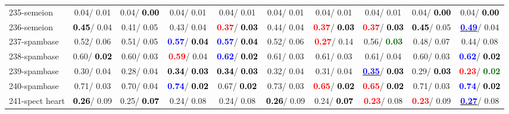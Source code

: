 \begin{table}[h]
\begin{center}
{\begin{tabular}{lc|c|c|c|c|c|c|c|c}
235-semeion &   0.04/  0.01 &   0.04/\textcolor{black}{\textbf{  0.00}} &   0.04/  0.01 &   0.04/  0.01 &   0.04/  0.01 &   0.04/  0.01 &   0.04/  0.01 &   0.04/\textcolor{black}{\textbf{  0.00}} &   0.04/\textcolor{black}{\textbf{  0.00}} \\
236-semeion & \textcolor{black}{\textbf{  0.45}}/  0.04 &   0.41/  0.05 &   0.43/  0.04 & \textcolor{red}{\textbf{  0.37}}/\textcolor{black}{\textbf{  0.03}} &   0.44/  0.04 & \textcolor{red}{\textbf{  0.37}}/\textcolor{black}{\textbf{  0.03}} & \textcolor{red}{\textbf{  0.37}}/\textcolor{black}{\textbf{  0.03}} & \textcolor{black}{\textbf{  0.45}}/  0.05 & \underline{\textcolor{blue}{\textbf{  0.49}}}/  0.04 \\
237-spambase &   0.52/  0.06 &   0.51/  0.05 & \textcolor{blue}{\textbf{  0.57}}/\textcolor{black}{\textbf{  0.04}} & \textcolor{blue}{\textbf{  0.57}}/\textcolor{black}{\textbf{  0.04}} &   0.52/  0.06 & \textcolor{red}{\textbf{  0.27}}/  0.14 &   0.56/\textcolor{darkgreen}{\textbf{  0.03}} &   0.48/  0.07 &   0.44/  0.08 \\
238-spambase &   0.60/\textcolor{black}{\textbf{  0.02}} &   0.60/  0.03 & \textcolor{red}{\textbf{  0.59}}/  0.04 & \textcolor{blue}{\textbf{  0.62}}/\textcolor{black}{\textbf{  0.02}} &   0.61/  0.03 &   0.61/  0.03 &   0.61/  0.04 &   0.60/  0.03 & \textcolor{blue}{\textbf{  0.62}}/\textcolor{black}{\textbf{  0.02}} \\ \hline
239-spambase &   0.30/  0.04 &   0.28/  0.04 & \textcolor{black}{\textbf{  0.34}}/\textcolor{black}{\textbf{  0.03}} & \textcolor{black}{\textbf{  0.34}}/\textcolor{black}{\textbf{  0.03}} &   0.32/  0.04 &   0.31/  0.04 & \underline{\textcolor{blue}{\textbf{  0.35}}}/\textcolor{black}{\textbf{  0.03}} &   0.29/\textcolor{black}{\textbf{  0.03}} & \textcolor{red}{\textbf{  0.23}}/\textcolor{darkgreen}{\textbf{  0.02}} \\
240-spambase &   0.71/  0.03 &   0.70/  0.04 & \textcolor{blue}{\textbf{  0.74}}/\textcolor{black}{\textbf{  0.02}} &   0.67/\textcolor{black}{\textbf{  0.02}} &   0.73/  0.03 & \textcolor{red}{\textbf{  0.65}}/\textcolor{black}{\textbf{  0.02}} & \textcolor{red}{\textbf{  0.65}}/\textcolor{black}{\textbf{  0.02}} &   0.71/  0.03 & \textcolor{blue}{\textbf{  0.74}}/\textcolor{black}{\textbf{  0.02}} \\
241-spect heart & \textcolor{black}{\textbf{  0.26}}/  0.09 &   0.25/\textcolor{black}{\textbf{  0.07}} &   0.24/  0.08 &   0.24/  0.08 & \textcolor{black}{\textbf{  0.26}}/  0.09 &   0.24/\textcolor{black}{\textbf{  0.07}} & \textcolor{red}{\textbf{  0.23}}/  0.08 & \textcolor{red}{\textbf{  0.23}}/  0.09 & \underline{\textcolor{blue}{\textbf{  0.27}}}/  0.08 \\

\end{tabular}}
\end{center}
\end{table}
